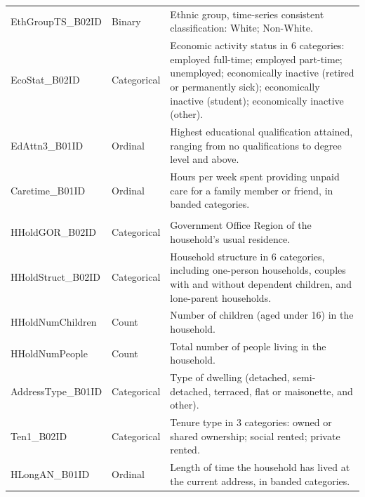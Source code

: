 \documentclass[11pt,a4paper]{article}
\begin{document}
\begin{longtable}{>{\ttfamily\small}p{4.8cm} >{\small}p{2.4cm} >{\RaggedRight\small}p{6.6cm}}
EthGroupTS\_B02ID
  & Binary
  & Ethnic group, time-series consistent classification:
    White; Non-White. \\[4pt]

EcoStat\_B02ID
  & Categorical
  & Economic activity status in 6 categories: employed
    full-time; employed part-time; unemployed;
    economically inactive (retired or permanently sick);
    economically inactive (student); economically
    inactive (other). \\[4pt]

EdAttn3\_B01ID
  & Ordinal
  & Highest educational qualification attained, ranging
    from no qualifications to degree level and above. \\[4pt]

Caretime\_B01ID
  & Ordinal
  & Hours per week spent providing unpaid care for a
    family member or friend, in banded categories. \\[4pt]

\multicolumn{3}{l}{\textbf{Household-level demographic variables}} \\[3pt]

HHoldGOR\_B02ID
  & Categorical
  & Government Office Region of the household's usual
    residence. \\[4pt]

HHoldStruct\_B02ID
  & Categorical
  & Household structure in 6 categories, including
    one-person households, couples with and without
    dependent children, and lone-parent households. \\[4pt]

HHoldNumChildren
  & Count
  & Number of children (aged under 16) in the
    household. \\[4pt]

HHoldNumPeople
  & Count
  & Total number of people living in the household. \\[4pt]

AddressType\_B01ID
  & Categorical
  & Type of dwelling (detached, semi-detached,
    terraced, flat or maisonette, and other). \\[4pt]

Ten1\_B02ID
  & Categorical
  & Tenure type in 3 categories: owned or shared
    ownership; social rented; private rented. \\[4pt]

HLongAN\_B01ID
  & Ordinal
  & Length of time the household has lived at the
    current address, in banded categories. \\[4pt]


\end{longtable}
\end{document}
